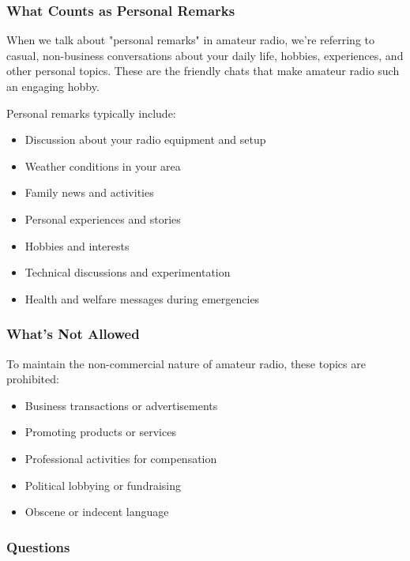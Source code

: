 \subsubsection*{What Counts as Personal Remarks}
When we talk about "personal remarks" in amateur radio, we're referring to casual, non-business conversations about your daily life, hobbies, experiences, and other personal topics. These are the friendly chats that make amateur radio such an engaging hobby.


Personal remarks typically include:
\begin{itemize}[noitemsep]
    \item Discussion about your radio equipment and setup
    \item Weather conditions in your area
    \item Family news and activities
    \item Personal experiences and stories
    \item Hobbies and interests
    \item Technical discussions and experimentation
    \item Health and welfare messages during emergencies
\end{itemize}

\subsubsection*{What's Not Allowed}
To maintain the non-commercial nature of amateur radio, these topics are prohibited:
\begin{itemize}[noitemsep]
    \item Business transactions or advertisements
    \item Promoting products or services
    \item Professional activities for compensation
    \item Political lobbying or fundraising
    \item Obscene or indecent language
\end{itemize}

\subsubsection{Questions}

